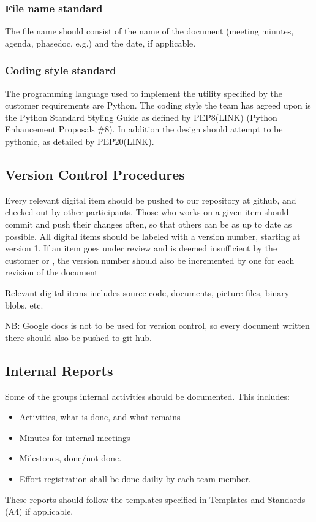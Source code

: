 \subsubsection{File name standard}
The file name should consist of the name of the document (meeting minutes,
agenda, phasedoc, e.g.) and the date, if applicable.

\subsubsection{Coding style standard}
The programming language used to implement the utility specified by the
customer requirements are Python. The coding style the team has agreed upon is
the Python Standard Styling Guide as defined by PEP8(LINK) (Python Enhancement
Proposals \#8). In addition the design should attempt to be pythonic, as
detailed by PEP20(LINK).

\subsection{Version Control Procedures}
Every relevant digital item should be pushed to our repository at github, and checked out by other participants. Those who works on a given item should commit and push their changes often, so that others can be as up to date as possible. All digital items should be labeled with a version number, starting at version 1. If an item goes under review and is deemed insufficient by the customer or  , the version number should also be incremented by one for each revision of the document

Relevant digital items includes source code, documents, picture files, binary blobs, etc.

NB: Google docs is not to be used for version control, so every document written there should also be pushed to git hub.

\subsection{Internal Reports}
Some of the groups internal activities should be documented. This includes:
\begin{itemize}
	\item Activities, what is done, and what remains
	\item Minutes for internal meetings
	\item Milestones, done/not done.
	\item Effort registration shall be done dailiy by each team member.
\end{itemize}
These reports should follow the templates specified in Templates and Standards (A4) if applicable.


